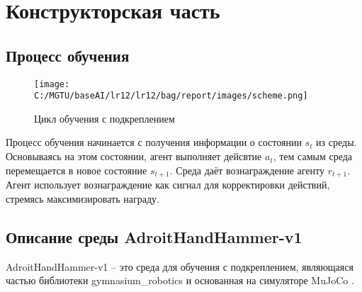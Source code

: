 \chapter{Конструкторская часть}

\section{Процесс обучения}

\begin{figure}[H]
    \centering
    \texttt{[image: C:/MGTU/baseAI/lr12/lr12/bag/report/images/scheme.png]}
    \caption{Цикл обучения с подкреплением}
\end{figure}
Процесс обучения начинается с получения информации о состоянии $s_t$ из среды. 
Основываясь на этом состоянии, агент выполняет дейсвтие $a_t$, тем самым среда перемещается в новое состояние $s_{t+1}$.
Среда даёт вознаграждение агенту $r_{t+1}$. Агент использует вознаграждение как сигнал для корректировки действий,
стремясь максимизировать награду.

\section{Описание среды AdroitHandHammer-v1}
AdroitHandHammer-v1 -- это среда для обучения с подкреплением, являющаяся частью библиотеки gymnasium\_robotics и основанная на симуляторе MuJoCo \cite{lib:gymnasium_robotics}.

